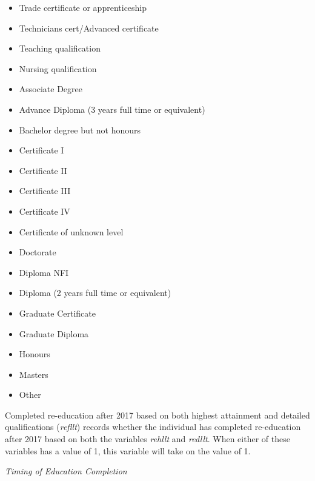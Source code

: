 \documentclass[12pt, a4paper]{article}
\begin{document}
\begin{itemize}
  \item Trade certificate or apprenticeship
  \item Technicians cert/Advanced certificate
  \item Teaching qualification 
  \item Nursing qualification 
  \item Associate Degree
  \item Advance Diploma (3 years full time or equivalent)
  \item Bachelor degree but not honours
  \item Certificate I
  \item Certificate II
  \item Certificate III
  \item Certificate IV
  \item Certificate of unknown level
  \item Doctorate
  \item Diploma NFI
  \item Diploma (2 years full time or equivalent)
  \item Graduate Certificate
  \item Graduate Diploma 
  \item Honours 
  \item Masters 
  \item Other 
\end{itemize}  
  
Completed re-education after 2017 based on both highest attainment and detailed qualifications (\textit{refllt}) records whether the individual has completed re-education after 2017 based on both the variables \textit{rehllt} and \textit{redllt}. When either of these variables has a value of 1, this variable will take on the value of 1. 

\emph{Timing of Education Completion}
\end{document}
